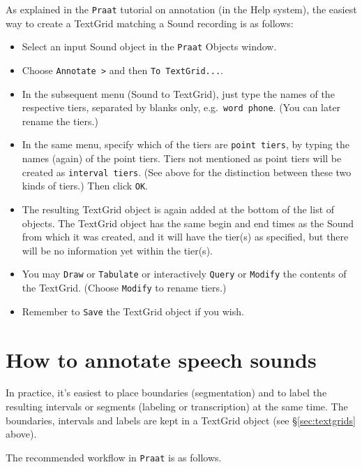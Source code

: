 \documentclass[
]{book}
\begin{document}
As explained in the \texttt{Praat} tutorial on annotation (in the Help system), the easiest way to create a TextGrid matching a Sound recording is as follows:

\begin{itemize}
\item
  Select an input Sound object in the \texttt{Praat} Objects window.
\item
  Choose \texttt{Annotate\ \textgreater{}} and then \texttt{To\ TextGrid...}.
\item
  In the subsequent menu (Sound to TextGrid), just type the names of the respective tiers, separated by blanks only, e.g.~\texttt{word\ phone}. (You can later rename the tiers.)
\item
  In the same menu, specify which of the tiers are \texttt{point\ tiers}, by typing the names (again) of the point tiers. Tiers not mentioned as point tiers will be created as \texttt{interval\ tiers}. (See above for the distinction between these two kinds of tiers.) Then click \texttt{OK}.
\item
  The resulting TextGrid object is again added at the bottom of the list of objects. The TextGrid object has the same begin and end times as the Sound from which it was created, and it will have the tier(s) as specified, but there will be no information yet within the tier(s).
\item
  You may \texttt{Draw} or \texttt{Tabulate} or interactively \texttt{Query} or \texttt{Modify} the contents of the TextGrid. (Choose \texttt{Modify} to rename tiers.)
\item
  Remember to \texttt{Save} the TextGrid object if you wish.
\end{itemize}

\section{How to annotate speech sounds}\label{sec:howtoannotate}

In practice, it's easiest to place boundaries (segmentation) and to label the resulting intervals or segments (labeling or transcription) at the same time. The boundaries, intervals and labels are kept in a TextGrid object (see §\ref{sec:textgrids} above).

\label{box-praattextgrideditor}
The recommended workflow in \texttt{Praat} is as follows.
\end{document}
